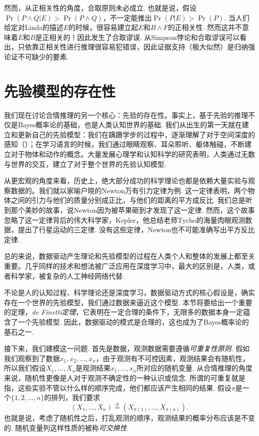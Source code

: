 然而，从正相关性的角度，合取原则未必成立. 也就是说，假设$\Pr(P\wedge Q|E)>\Pr(P\wedge Q)$，不一定能推出$\Pr(P|E)>\Pr(P)$. 当人们给定对Linda的描述$E$的时候，很容易建立起$E$和$B\wedge F$的正相关性. 然而这并不意味着$E$和$B$是正相关的！因此发生了合取谬误. 从Simpson悖论和合取谬误可以看出，只依靠正相关性进行推理很容易犯错误，因此证据支持（极大似然）是归纳强论证不可缺少的要素.

\section{先验模型的存在性}

我们现在讨论合情推理的另一个核心：先验的存在性。事实上，基于先验的推理不仅是Bayes概率论的基础，也是人类认知世界的基础. 我们从出生的第一天就在建立和更新自己的先验模型：我们在蹒跚学步的过程中，逐渐理解了对于空间深度的感知（）；在学习语言的时候，我们通过眼睛观察、耳朵聆听、躯体触碰，不断建立对于物体和动作的概念。大量发展心理学和认知科学的研究表明，人类通过无数与世界的交互，建立了对于整个世界的先验认知模型.

从更宏观的角度来看，历史上，绝大部分成功的科学理论也都是依赖大量实验与观察数据的。我们就以家喻户晓的Newton万有引力定律为例. 这一定律表明，两个物体之间的引力与他们的质量分别成正比，与他们的距离的平方成反比. 我们总是听到那个美妙的故事，说Newton因为被苹果砸到才发现了这一定律. 然而，这个故事忽略了这一定律背后的伟大科学家，Kepler，他总结老师Tycho的海量肉眼观测数据，提出了行星运动的三定律. 没有这些定律，Newton也不可能准确写出平方反比定律. 

总的来说，数据驱动产生理论和先验模型的过程在人类个人和整体的发展上都至关重要。几乎同样的技术和想法被广泛应用在深度学习中，最大的区别是，人类，或者科学家，被复杂的人工神经网络代替. 

不论是人的认知过程、科学理论还是深度学习，数据驱动方式的核心假设是，确实存在一个世界的先验模型，我们通过数据来逼近这个模型. 本节将要给出一个重要的定理，\emph{de Finetti定理}，它表明在一定合理的条件下，无限多的数据本身一定蕴含了一个先验模型. 因此，数据驱动的模式是合理的，这也成为了Bayes概率论的基石之一.

接下来，我们建模这一问题. 首先是数据，观测数据需要遵循\emph{可重复性原则}. 假如我们观察到了数据$x_1,x_2,\dots,x_n$，由于观测有不可控因素，观测结果会有随机性，所以我们假设$X_1,\dots,X_n$是观测结果$x_1,\dots,x_n$所对应的随机变量. 从合情推理的角度来说，随机性更像是人对于观测不确定性的一种认识或信念. 所谓的可重复就是指，这些实验不管以什么样的顺序完成，他们都应该产生相同的结果. 假设$\pi$是一个$\{1,2,\dots,n\}$的排列，我们要求
\[
    (X_1,\dots,X_n)\stackrel{d}{=}(X_{\pi(1)},\dots,X_{\pi(n)}).
\]
也就是说，考虑了随机性之后，打乱观测的顺序，观测结果的概率分布应该是不变的. 随机变量列这样性质的被称\emph{可交换性}. 

